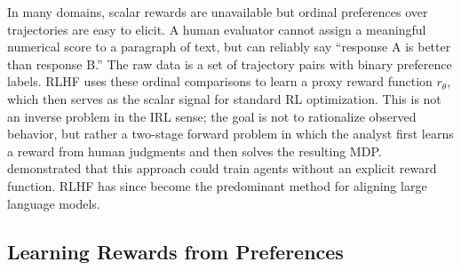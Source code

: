 In many domains, scalar rewards are unavailable but ordinal preferences over trajectories are easy to elicit. A human evaluator cannot assign a meaningful numerical score to a paragraph of text, but can reliably say ``response A is better than response B.'' The raw data is a set of trajectory pairs with binary preference labels. RLHF uses these ordinal comparisons to learn a proxy reward function $r_\theta$, which then serves as the scalar signal for standard RL optimization. This is not an inverse problem in the IRL sense; the goal is not to rationalize observed behavior, but rather a two-stage forward problem in which the analyst first learns a reward from human judgments and then solves the resulting MDP. \citet{christiano:2017} demonstrated that this approach could train agents without an explicit reward function. RLHF has since become the predominant method for aligning large language models.

\subsection{Learning Rewards from Preferences}

